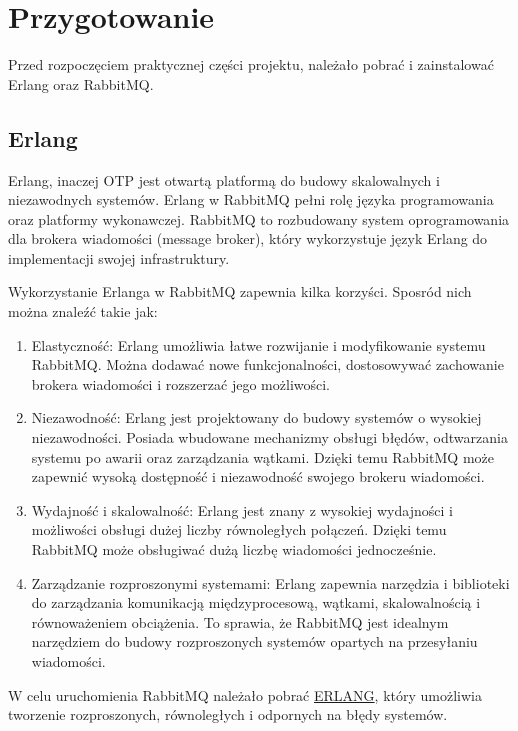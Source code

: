 \documentclass[12pt,twoside]{article}
\begin{document}
\clearpage

\section{Przygotowanie}

Przed rozpoczęciem praktycznej części projektu, należało pobrać i zainstalować Erlang oraz RabbitMQ.

\subsection{Erlang}
Erlang, inaczej OTP jest otwartą platformą do budowy skalowalnych i niezawodnych systemów. Erlang w RabbitMQ pełni rolę języka programowania oraz platformy wykonawczej. RabbitMQ to rozbudowany system oprogramowania dla brokera wiadomości (message broker), który wykorzystuje język Erlang do implementacji swojej infrastruktury.

Wykorzystanie Erlanga w RabbitMQ zapewnia kilka korzyści. Sposród nich można znaleźć takie jak:
\begin{enumerate}[label=\alph*), leftmargin=1.25cm]
	\item Elastyczność: Erlang umożliwia łatwe rozwijanie i modyfikowanie systemu RabbitMQ. Można dodawać nowe funkcjonalności, dostosowywać zachowanie brokera wiadomości i rozszerzać jego możliwości.
	\item Niezawodność: Erlang jest projektowany do budowy systemów o wysokiej niezawodności. Posiada wbudowane mechanizmy obsługi błędów, odtwarzania systemu po awarii oraz zarządzania wątkami. Dzięki temu RabbitMQ może zapewnić wysoką dostępność i niezawodność swojego brokeru wiadomości.
	\item Wydajność i skalowalność: Erlang jest znany z wysokiej wydajności i możliwości obsługi dużej liczby równoległych połączeń. Dzięki temu RabbitMQ może obsługiwać dużą liczbę wiadomości jednocześnie.
	\item Zarządzanie rozproszonymi systemami: Erlang zapewnia narzędzia i biblioteki do zarządzania komunikacją międzyprocesową, wątkami, skalowalnością i równoważeniem obciążenia. To sprawia, że RabbitMQ jest idealnym narzędziem do budowy rozproszonych systemów opartych na przesyłaniu wiadomości.
\end{enumerate}

W celu uruchomienia RabbitMQ należało pobrać \href{https://erlang.org/download/otp_versions_tree.html}{ERLANG}, który umożliwia tworzenie rozproszonych, równoległych i odpornych na błędy systemów. 
\clearpage
\end{document}
